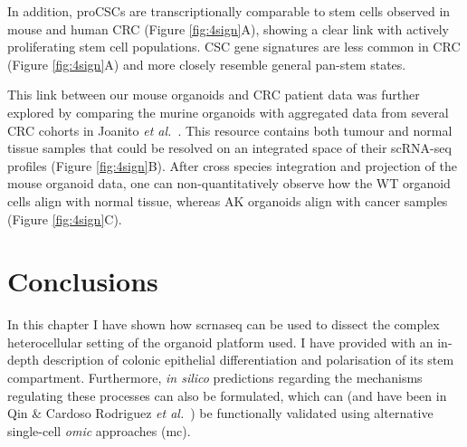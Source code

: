 In addition, proCSCs are transcriptionally comparable to stem cells observed in mouse and human CRC (Figure \ref{fig:4sign}A), showing a clear link with actively proliferating stem cell populations. CSC gene signatures are less common in CRC (Figure \ref{fig:4sign}A) and more closely resemble general pan-stem states.

This link between our mouse organoids and CRC patient data was further explored by comparing the murine organoids with aggregated data from several CRC cohorts in Joanito \emph{et al.}~\cite{joanito_single-cell_2022}. This resource contains both tumour and normal tissue samples that could be resolved on an integrated space of their scRNA-seq profiles (Figure \ref{fig:4sign}B). After cross species integration and projection of the mouse organoid data, one can non-quantitatively observe how the WT organoid cells align with normal tissue, whereas AK organoids align with cancer samples (Figure \ref{fig:4sign}C). 

\newpage
\section{Conclusions}


In this chapter I have shown how \acrshort{scrnaseq} can be used to dissect the complex heterocellular setting of the organoid platform used. I have provided with an in-depth description of colonic epithelial differentiation and polarisation of its stem compartment. Furthermore, \emph{in silico} predictions regarding the mechanisms regulating these processes can also be formulated, which can (and have been in Qin \& Cardoso Rodriguez \emph{et al.}~\cite{cardoso_rodriguez_single-cell_2023}) be functionally validated using alternative single-cell \emph{omic} approaches (\acrshort{mc}).

